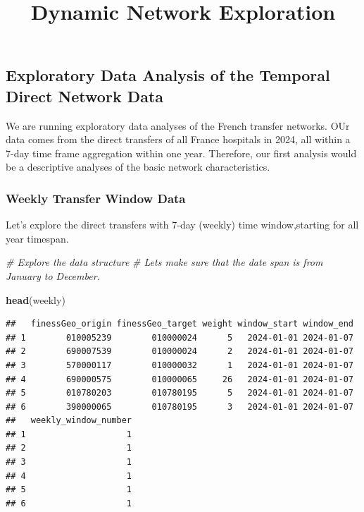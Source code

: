 \documentclass[
]{article}
\title{Dynamic Network Exploration}
\author{}
\date{\vspace{-2.5em}}
\newenvironment{Shaded}{\begin{snugshade}}{\end{snugshade}}
\newcommand{\CommentTok}[1]{\textcolor[rgb]{0.56,0.35,0.01}{\textit{#1}}}
\newcommand{\FunctionTok}[1]{\textcolor[rgb]{0.13,0.29,0.53}{\textbf{#1}}}
\newcommand{\NormalTok}[1]{#1}
\begin{document}
\maketitle

\subsection{Exploratory Data Analysis of the Temporal Direct Network
Data}\label{exploratory-data-analysis-of-the-temporal-direct-network-data}

We are running exploratory data analyses of the French transfer
networks. OUr data comes from the direct transfers of all France
hospitals in 2024, all within a 7-day time frame aggregation within one
year. Therefore, our first analysis would be a descriptive analyses of
the basic network characteristics.

\subsubsection{Weekly Transfer Window
Data}\label{weekly-transfer-window-data}

Let's explore the direct transfers with 7-day (weekly) time
window,starting for all year timespan.

\begin{Shaded}
\begin{Highlighting}[]
\CommentTok{\# Explore the data structure}
\CommentTok{\# Let\textquotesingle{}s make sure that the date span is from January to December.}

\FunctionTok{head}\NormalTok{(weekly)}
\end{Highlighting}
\end{Shaded}

\begin{verbatim}
##   finessGeo_origin finessGeo_target weight window_start window_end
## 1        010005239        010000024      5   2024-01-01 2024-01-07
## 2        690007539        010000024      2   2024-01-01 2024-01-07
## 3        570000117        010000032      1   2024-01-01 2024-01-07
## 4        690000575        010000065     26   2024-01-01 2024-01-07
## 5        010780203        010780195      5   2024-01-01 2024-01-07
## 6        390000065        010780195      3   2024-01-01 2024-01-07
##   weekly_window_number
## 1                    1
## 2                    1
## 3                    1
## 4                    1
## 5                    1
## 6                    1
\end{verbatim}
\end{document}
